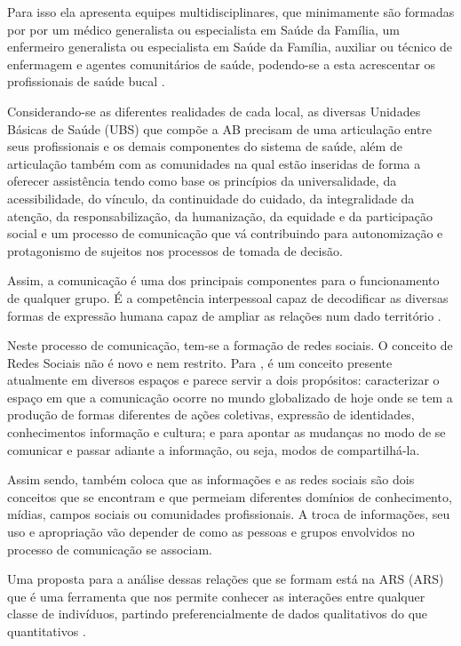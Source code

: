 Para isso ela apresenta equipes multidisciplinares, que minimamente são formadas por por um médico generalista ou especialista em Saúde da Família, um enfermeiro generalista ou especialista em Saúde da Família, auxiliar ou técnico de enfermagem e agentes comunitários de saúde, podendo-se a esta acrescentar os profissionais de saúde bucal \cite{ministerio2012politica}.

Considerando-se as diferentes realidades de cada local, as diversas Unidades Básicas de Saúde (\acrshort{UBS}) que compõe a \acrshort{AB} precisam de uma articulação entre seus profissionais e os demais componentes do sistema de saúde, além de articulação também com as comunidades na qual estão inseridas de forma a oferecer assistência tendo como base os princípios da universalidade, da acessibilidade, do vínculo, da continuidade do cuidado, da integralidade da atenção, da responsabilização, da humanização, da equidade e da participação social e um processo de comunicação que vá contribuindo para autonomização e protagonismo de sujeitos nos processos de tomada de decisão.

Assim, a comunicação é uma dos principais componentes para o funcionamento de qualquer grupo. É a competência interpessoal capaz de decodificar as diversas formas de expressão humana capaz de ampliar as relações num dado território \cite{rocha2013avaliaccao}.

Neste processo de comunicação, tem-se a formação de redes sociais. O conceito de Redes Sociais não é novo e nem restrito. Para , é um conceito presente atualmente em diversos espaços e parece servir a dois propósitos: caracterizar o espaço em que a comunicação ocorre no mundo globalizado de hoje onde se tem a produção de formas diferentes de ações coletivas, expressão de identidades, conhecimentos informação e cultura; e para apontar as mudanças no modo de se comunicar e passar adiante a informação, ou seja, modos de compartilhá-la.

Assim sendo,  também coloca que as informações e as redes sociais são dois conceitos que se encontram e que permeiam diferentes domínios de conhecimento, mídias, campos sociais ou comunidades profissionais. A troca de informações, seu uso e apropriação vão depender de como as pessoas e grupos envolvidos no processo de comunicação se associam.

Uma proposta para a análise dessas relações que se formam está na \acrlong{ARS} (\acrshort{ARS}) que é uma ferramenta que nos permite conhecer as interações entre qualquer classe de indivíduos, partindo preferencialmente de dados qualitativos do que quantitativos \cite{alejandro2005manual}.


